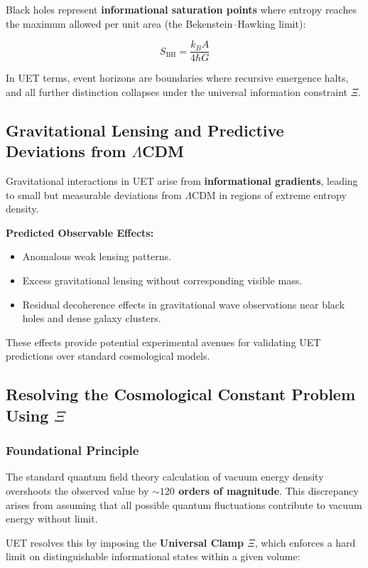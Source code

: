 \documentclass[12pt,a4paper]{article}
\begin{document}
Black holes represent \textbf{informational saturation points} where entropy reaches the maximum allowed per unit area (the Bekenstein–Hawking limit):

\[
S_{\text{BH}} = \frac{k_B A}{4 \hbar G}
\]

In UET terms, event horizons are boundaries where recursive emergence halts, and all further distinction collapses under the universal information constraint \(\Xi\).

\subsection{Gravitational Lensing and Predictive Deviations from \(\Lambda\)CDM}

Gravitational interactions in UET arise from \textbf{informational gradients}, leading to small but measurable deviations from \(\Lambda\)CDM in regions of extreme entropy density.

\textbf{Predicted Observable Effects:}
\begin{itemize}
    \item Anomalous weak lensing patterns.
    \item Excess gravitational lensing without corresponding visible mass.
    \item Residual decoherence effects in gravitational wave observations near black holes and dense galaxy clusters.
\end{itemize}

These effects provide potential experimental avenues for validating UET predictions over standard cosmological models.
\subsection{Resolving the Cosmological Constant Problem Using \(\Xi\)}

\subsubsection*{Foundational Principle}

The standard quantum field theory calculation of vacuum energy density overshoots the observed value by \textbf{\(\sim 120\) orders of magnitude}. This discrepancy arises from assuming that all possible quantum fluctuations contribute to vacuum energy without limit.

UET resolves this by imposing the \textbf{Universal Clamp \(\Xi\)}, which enforces a hard limit on distinguishable informational states within a given volume:
\end{document}
